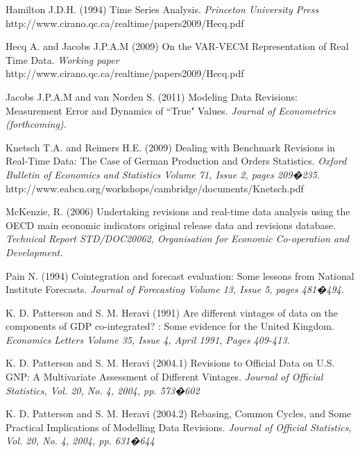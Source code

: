 \documentclass[11pt]{article}
\begin{document}
\begin{thebibliography}{99}
\bibitem{} Hamilton J.D.H. (1994) Time Series Analysis. {\it
Princeton University Press}
http://www.cirano.qc.ca/realtime/papers2009/Hecq.pdf




\bibitem{} Hecq A. and Jacobs J.P.A.M (2009) On the VAR-VECM Representation of Real Time Data. {\it
Working paper}
http://www.cirano.qc.ca/realtime/papers2009/Hecq.pdf



\bibitem{} Jacobs J.P.A.M and van Norden S. (2011)  Modeling Data Revisions: Measurement Error
and Dynamics of ``True" Values. {\it
Journal of Econometrics (forthcoming).}



\bibitem{} Knetsch T.A. and Reimers H.E. (2009)  Dealing with Benchmark Revisions in Real-Time Data: The Case of German Production and Orders Statistics. {\it
Oxford Bulletin of Economics and Statistics
Volume 71, Issue 2, pages 209�235.}
http://www.eabcn.org/workshops/cambridge/documents/Knetsch.pdf






\bibitem{} McKenzie, R. (2006)  Undertaking revisions and real-time data analysis using
the OECD main economic indicators original release data and revisions
database. {\it
Technical Report STD/DOC20062, Organisation for
Economic Co-operation and Development.}





\bibitem{} Pain N. (1994)  Cointegration and forecast evaluation: Some lessons from National Institute Forecasts. {\it
Journal of Forecasting
Volume 13, Issue 5, pages 481�494.}





\bibitem{} K. D. Patterson and S. M. Heravi (1991)  Are different vintages of data on the components of GDP co-integrated? : Some evidence for the United Kingdom. {\it
Economics Letters
Volume 35, Issue 4, April 1991, Pages 409-413.}



\bibitem{} K. D. Patterson and S. M. Heravi (2004.1)  Revisions to Official Data on U.S. GNP:
A Multivariate Assessment of Different Vintages. {\it
Journal of Official Statistics, Vol. 20, No. 4, 2004, pp. 573�602}



\bibitem{} K. D. Patterson and S. M. Heravi (2004.2)  Rebasing, Common Cycles, and Some Practical Implications
of Modelling Data Revisions. {\it
Journal of Official Statistics, Vol. 20, No. 4, 2004, pp. 631�644}









\end{thebibliography}
\end{document}
